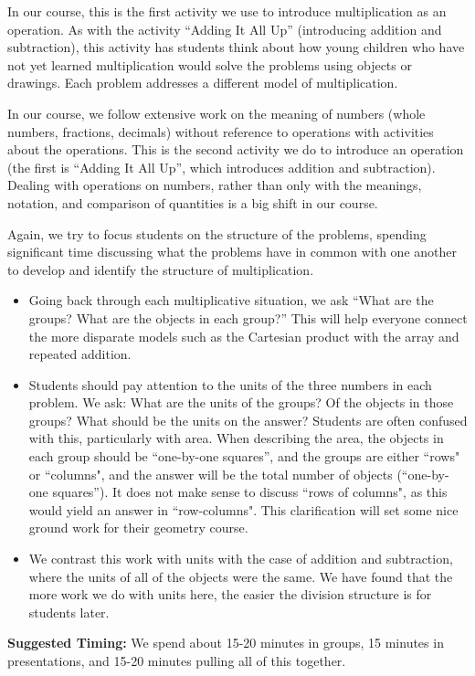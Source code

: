 \documentclass{ximera}
\begin{document}
\newpage
\begin{instructorNotes}
In our course, this is the first activity we use to introduce multiplication as an operation.  As with the activity ``Adding It All Up'' (introducing addition and subtraction), this activity has students think about how young children who have not yet learned multiplication would solve the problems using objects or drawings.  Each problem addresses a different model of multiplication.

In our course, we follow extensive work on the meaning of numbers (whole numbers, fractions, decimals) without reference to operations with activities about the operations.  This is the second activity we do to introduce an operation (the first is ``Adding It All Up'', which introduces addition and subtraction). Dealing with operations on numbers, rather than only with the meanings, notation, and comparison of quantities is a big shift in our course.

Again, we try to focus students on the structure of the problems, spending significant time discussing what the problems have in common with one another to develop and identify the structure of multiplication.

\begin{itemize}
	\item Going back through each multiplicative situation, we ask ``What are the groups? What are the objects in each group?''  This will help everyone connect the more disparate models such as the Cartesian product with the array and repeated addition.  
	\item Students should pay attention to the units of the three numbers in each problem. We ask: What are the units of the groups?  Of the objects in those groups?  What should be the units on the answer?  Students are often confused with this, particularly with area.  When describing the area, the objects in each group should be ``one-by-one squares'', and the groups are either ``rows" or ``columns", and the answer will be the total number of objects (``one-by-one squares''). It does not make sense to discuss ``rows of columns", as this would yield an answer in ``row-columns". This clarification will set some nice ground work for their geometry course.
	\item We contrast this work with units with the case of addition and subtraction, where the units of all of the objects were the same.  We have found that the more work we do with units here, the easier the division structure is for students later.
\end{itemize}




{\bf Suggested Timing:} We spend about 15-20 minutes in groups, 15 minutes in presentations, and 15-20 minutes pulling all of this together.
\end{instructorNotes}
\end{document}
